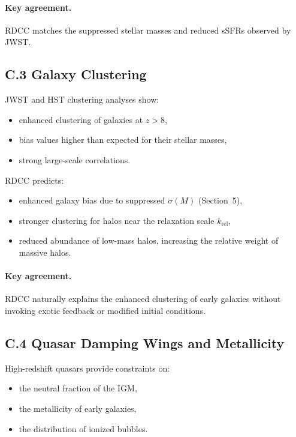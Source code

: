 \documentclass[11pt,a4paper]{article}
\begin{document}
\paragraph{Key agreement.}
RDCC matches the suppressed stellar masses and reduced sSFRs observed by JWST.

\subsection*{C.3 Galaxy Clustering}

JWST and HST clustering analyses show:

\begin{itemize}
    \item enhanced clustering of galaxies at $z > 8$,
    \item bias values higher than expected for their stellar masses,
    \item strong large-scale correlations.
\end{itemize}

RDCC predicts:

\begin{itemize}
    \item enhanced galaxy bias due to suppressed $\sigma(M)$ (Section~5),
    \item stronger clustering for halos near the relaxation scale $k_{\mathrm{rel}}$,
    \item reduced abundance of low-mass halos, increasing the relative weight of massive halos.
\end{itemize}

\paragraph{Key agreement.}
RDCC naturally explains the enhanced clustering of early galaxies without invoking exotic 
feedback or modified initial conditions.

\subsection*{C.4 Quasar Damping Wings and Metallicity}

High-redshift quasars provide constraints on:

\begin{itemize}
    \item the neutral fraction of the IGM,
    \item the metallicity of early galaxies,
    \item the distribution of ionized bubbles.
\end{itemize}
\end{document}

